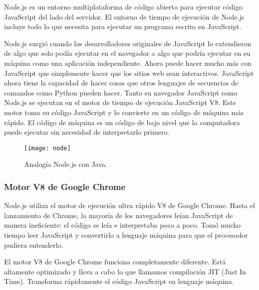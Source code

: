 Node.js es un entorno multiplataforma de código abierto para ejecutar código JavaScript del lado del servidor. El entorno de tiempo de ejecución de Node.js incluye todo lo que necesita para ejecutar un programa escrito en JavaScript. 
\vspace{0.8cm}

Node.js surgió cuando los desarrolladores originales de JavaScript lo extendieron de algo que solo podía ejecutar en el navegador a algo que podría ejecutar en su máquina como una aplicación independiente. Ahora puede hacer mucho más con JavaScript que simplemente hacer que los sitios web sean interactivos. JavaScript ahora tiene la capacidad de hacer cosas que otros lenguajes de secuencias de comandos como Python pueden hacer. Tanto su navegador JavaScript como Node.js se ejecutan en el motor de tiempo de ejecución JavaScript V8. Este motor toma su código JavaScript y lo convierte en un código de máquina más rápido. El código de máquina es un código de bajo nivel que la computadora puede ejecutar sin necesidad de interpretarlo primero.
\vspace{0.8cm}

\begin{figure}[H]
  \centering
  \texttt{[image: node]}
  \caption{Analogía Node.js con Java.}
\end{figure}

\subsubsection{Motor V8 de Google Chrome}
Node.js utiliza el motor de ejecución ultra rápido V8 de Google Chrome. Hasta el lanzamiento de Chrome, la mayoría de los navegadores leían JavaScript de manera ineficiente: el código se leía e interpretaba poco a poco. Tomó mucho tiempo leer JavaScript y convertirlo a lenguaje máquina para que el procesador pudiera entenderlo. 
\vspace{0.8cm}

El motor V8 de Google Chrome funciona completamente diferente. Está altamente optimizado y lleva a cabo lo que llamamos compilación JIT (Just In Time). Transforma rápidamente el código JavaScript en lenguaje máquina.
\vspace{0.8cm}

